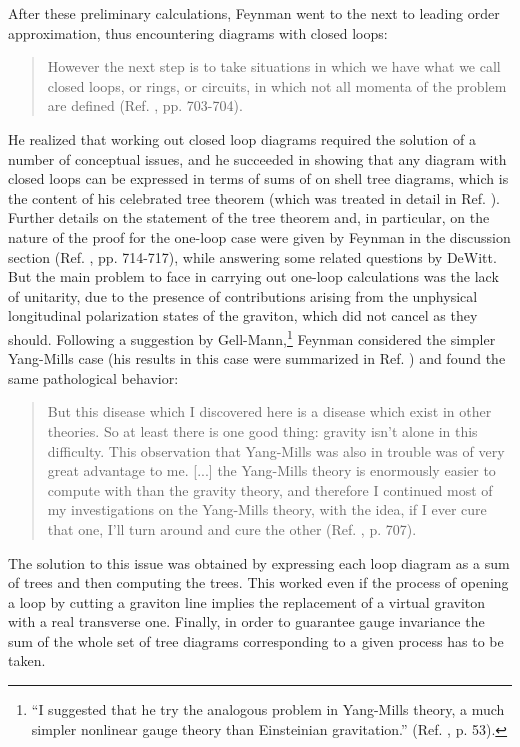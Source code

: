 \documentclass{ws-procs961x669}            %
\begin{document}
After these preliminary calculations, Feynman went to the next to
leading order approximation, thus encountering diagrams with
closed loops:
%
\begin{quote}
However the next step is to take situations in which we have what
we call closed loops, or rings, or circuits, in which not all
momenta of the problem are defined (Ref. ,
pp. 703-704).
\end{quote}
%
He realized that working out closed loop diagrams required the
solution of a number of conceptual issues, and he succeeded in
showing that any diagram with closed loops can be expressed in
terms of sums of on shell tree diagrams, which is the content of
his celebrated tree theorem (which was treated in detail in Ref.
). Further details on the statement of the
tree theorem and, in particular, on the nature of the proof for
the one-loop case were given by Feynman in the discussion section
(Ref. , pp. 714-717), while answering some
related questions by DeWitt. But the main problem to face in
carrying out one-loop calculations was the lack of unitarity, due
to the presence of contributions arising from the unphysical
longitudinal polarization states of the graviton, which did not
cancel as they should. Following a suggestion by
Gell-Mann,\footnote{``I suggested that he try the analogous
problem in Yang-Mills theory, a much simpler nonlinear gauge
theory than Einsteinian gravitation.'' (Ref. ,
p. 53).} Feynman considered the simpler Yang-Mills case (his
results in this case were summarized in Ref.
) and found the same pathological behavior:
%
\begin{quote}
But this disease which I discovered here is a disease which exist
in other theories. So at least there is one good thing: gravity
isn't alone in this difficulty. This observation that Yang-Mills
was also in trouble was of very great advantage to me. [...] the
Yang-Mills theory is enormously easier to compute with than the
gravity theory, and therefore I continued most of my
investigations on the Yang-Mills theory, with the idea, if I ever
cure that one, I'll turn around and cure the other (Ref.
, p. 707).
\end{quote}
%
The solution to this issue was obtained by expressing each loop
diagram as a sum of trees and then computing the trees. This
worked even if the process of opening a loop by cutting a graviton
line implies the replacement of a virtual graviton with a real
transverse one. Finally, in order to guarantee gauge invariance
the sum of the whole set of tree diagrams corresponding to a given
process has to be taken.
\end{document}
